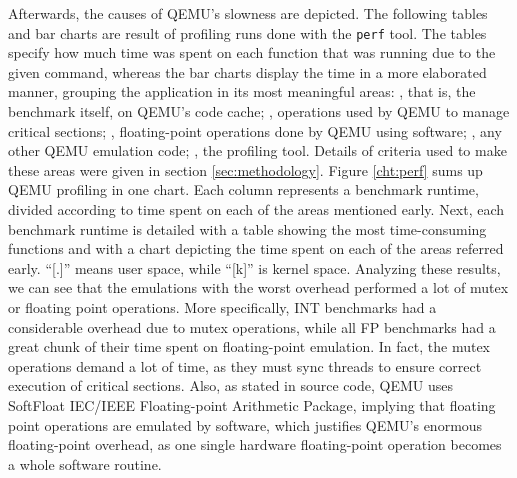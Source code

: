 \documentclass[11pt,twoside]{article}
\begin{document}
  Afterwards, the causes of QEMU's slowness are depicted.
  The following tables and bar charts are result of
  profiling runs done with the {\tt perf} tool.
  The tables specify how much time was spent on
  each function that was running due to the given command,
  whereas the bar charts display the time in a more elaborated
  manner, grouping the application in its most meaningful areas:
  \benchmarkname, that is, the benchmark itself,
  on QEMU's code cache;
  \mutexname, operations used by QEMU to manage critical sections;
  \fpname, floating-point operations done by QEMU using software;
  \qname, any other QEMU emulation code;
  \perfname, the profiling tool.
  Details of criteria used to make these areas were given
  in section \ref{sec:methodology}.
  Figure \ref{cht:perf} sums up QEMU profiling in one chart.
  Each column represents a benchmark runtime, divided according
  to time spent on each of the areas mentioned early.
  Next, each benchmark runtime is detailed with a table showing
  the most time-consuming functions and with a chart depicting
  the time spent on each of the areas referred early.
  ``[.]'' means user space, while ``[k]'' is kernel space.
  Analyzing these results, we can see that
  the emulations with the worst overhead
  performed a lot of mutex or floating point operations.
  More specifically, INT benchmarks had a considerable overhead
  due to mutex operations, while all FP benchmarks had a
  great chunk of their time spent on floating-point emulation.
  In fact, the
  mutex operations demand
  a lot of time, as they must sync threads
  to ensure correct execution of critical sections.
  Also, as stated in source code, QEMU uses 
  SoftFloat IEC/IEEE Floating-point Arithmetic Package, implying
  that floating point operations are emulated by software,
  which justifies QEMU's enormous floating-point overhead,
  as one single hardware floating-point operation becomes
  a whole software routine.
\end{document}
